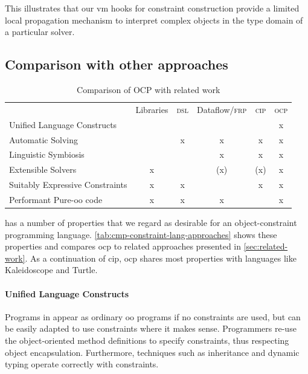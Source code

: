 This illustrates that our \ac{vm} hooks for constraint construction
provide a limited local propagation mechanism to interpret complex
objects in the type domain of a particular solver.

\subsection{Comparison with other approaches}
\label{sec:comparison}

\begin{table}[b!]
  \centering
  \begin{tabular}{l|c|c|c|c|c}
    & Libraries & \textsc{dsl} & Dataflow/\textsc{frp} & \textsc{cip} & \textsc{ocp} \\
    Unified Language Constructs & & & & & x \\
    Automatic Solving & & x & x & x & x \\
    Linguistic Symbiosis & & & x & x & x \\
    Extensible Solvers & x & & (x) & (x) & x \\
    Suitably Expressive Constraints & x & x & & x & x \\
    Performant Pure-\ac{oo} code & x & x & x & & x \\
  \end{tabular}
  \caption{Comparison of OCP with related work}
  \label{tab:cmp-constraint-lang-approaches}
\end{table}

\langname has a number of properties that we regard as desirable for
an object-constraint programming
language. \autoref{tab:cmp-constraint-lang-approaches} shows these
properties and compares \ac{ocp} to related approaches presented in
\autoref{sec:related-work}.  As a continuation of
\ac{cip}, \ac{ocp} shares most properties with \DIFdelbegin {}\DIFdelend languages like
Kaleidoscope and Turtle.

\paragraph{Unified Language Constructs}
Programs in \langname appear as ordinary \ac{oo} programs if no
constraints are used, but can be easily adapted to use constraints
where it makes sense. Programmers re-use the object-oriented method
definitions to specify constraints, thus respecting object
encapsulation. Furthermore, techniques such as inheritance and dynamic
typing operate correctly with constraints.

